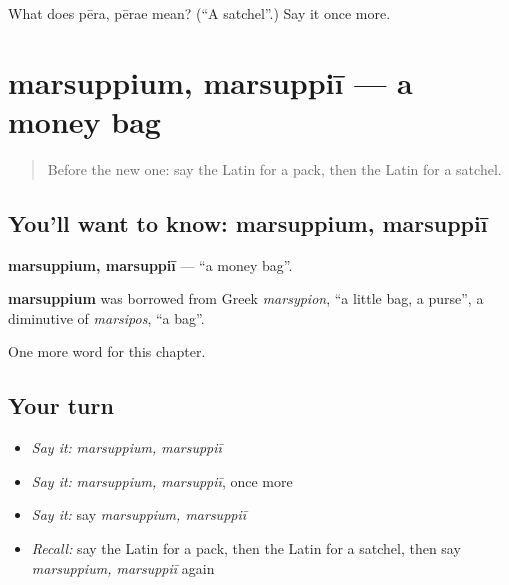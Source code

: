 \begin{tcolorbox}[breakable,colback=teal!4,colframe=teal!35!black,title={Before you move on}]
What does pēra, pērae mean? (\textquotedblleft{}A satchel\textquotedblright{}.) Say it once more.
\end{tcolorbox}
\section[marsuppium, marsuppiī]{marsuppium, marsuppiī — a money bag}

\label{lesson:LA-C254-marsuppium}



\begin{quote}
Before the new one: say the Latin for a pack, then the Latin for a satchel.
\end{quote}

\subsection*{You'll want to know: marsuppium, marsuppiī}
\textbf{marsuppium, marsuppiī} — \textquotedblleft{}a money bag\textquotedblright{}.

\begin{cousinweb}
\textbf{marsuppium} was borrowed from Greek \emph{marsypion}, \textquotedblleft{}a little bag, a purse\textquotedblright{}, a diminutive of \emph{marsipos}, \textquotedblleft{}a bag\textquotedblright{}.
\end{cousinweb}

\begin{grammarlens}[title={What you've built}]
One more word for this chapter.
\end{grammarlens}

\subsection*{Your turn}
\begin{itemize}
\raggedright
  \item \emph{Say it:} \emph{marsuppium, marsuppiī}
  \item \emph{Say it:} \emph{marsuppium, marsuppiī}, once more
  \item \emph{Say it:} say \emph{marsuppium, marsuppiī}
  \item \emph{Recall:} say the Latin for a pack, then the Latin for a satchel, then say \emph{marsuppium, marsuppiī} again
\end{itemize}

